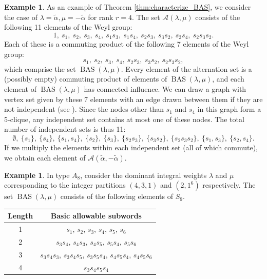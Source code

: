 \documentclass{amsart}
\theoremstyle{definition}
\newtheorem{example}[theorem]{Example}
\DeclareMathOperator{\BAS}{BAS}
\newcommand{\hroot}{\tilde{\alpha}}
\begin{document}
\begin{example}

As an example of Theorem \ref{thm:characterize_BAS}, we consider the case of $\lambda = \hroot, \mu = -\hroot$ for rank $r=4$. The set $\mathcal A(\lambda, \mu)$ consists of the following 11 elements of the Weyl group: \[1,~ s_1,~ s_2,~ s_3,~ s_4,~ s_1s_3,~ s_1s_4,~ s_2s_3,~ s_3s_2,~ s_2s_4,~ s_2s_3s_2.\] Each of these is a commuting product of the following 7 elements of the Weyl group:\[s_1,~ s_2,~ s_3,~ s_4,~ s_2s_3,~ s_3s_2,~ s_2s_3s_2,\] which comprise the set $\BAS(\lambda,\mu)$. Every element of the alternation set is a (possibly empty) commuting product of elements of $\BAS(\lambda,\mu)$, and each element of $\BAS(\lambda,\mu)$ has connected influence. We can draw a graph with vertex set given by these 7 elements with an edge drawn between them if they are not independent (see ). Since the nodes other than $s_1$ and $s_4$ in this graph form a 5-clique, any independent set contains at most one of these nodes. The total number of independent sets is thus 11: \begin{equation}
\emptyset,~ \{s_1\},~ \{s_4\},~ \{s_1, s_4\},~ \{s_2\},~ \{s_3\},~ \{s_2s_3\},~ \{s_3s_2\},~ \{s_2s_3s_2\},~ \{s_1, s_3\},~ \{s_2, s_4\}. \nonumber
\end{equation} If we multiply the elements within each independent set (all of which commute), we obtain each element of $\mathcal A(\hroot, -\hroot)$.

\end{example}


\begin{example}
      In type $A_8$, consider the dominant integral weights $\lambda$ and $\mu$ corresponding to the integer partitions $(4,3,1)$ and $(2,1^6)$ respectively. The set $\BAS(\lambda,\mu)$ consists of the following elements of $S_9$. \begin{center}
          \begin{tabular}{c|c}
              Length & Basic allowable subwords \\ \hline
              1 & $s_1$, $s_2$, $s_3$, $s_4$, $s_5$, $s_6$\\
              2 & $s_3s_4$, $s_4s_3$, $s_4s_5$, $s_5s_4$, $s_5s_6$\\
              3 & $s_3s_4s_3$, $s_3s_4s_5$, $s_3s_5s_4$, $s_4s_5s_4$, $s_4s_5s_6$\\
              4 & $s_3s_4s_5s_4$
          \end{tabular}
      \end{center}
\end{example}
\end{document}
